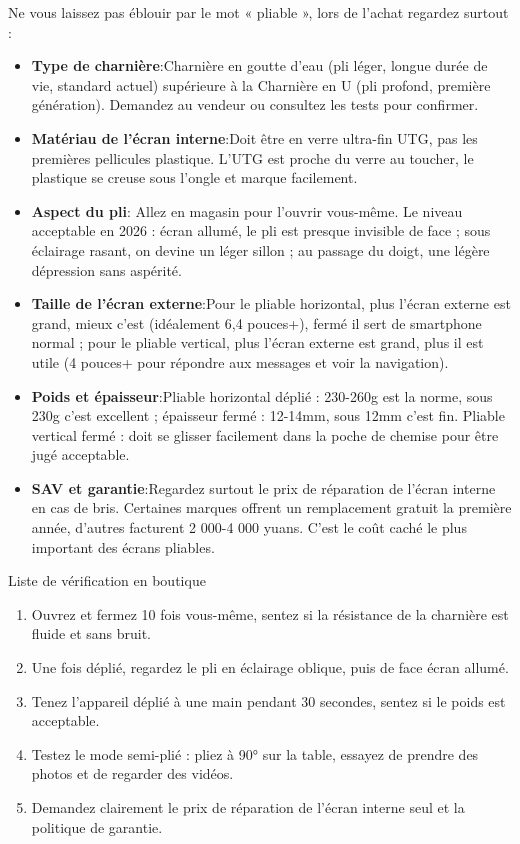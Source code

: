 
Ne vous laissez pas éblouir par le mot « pliable », lors de l'achat regardez surtout :

\begin{itemize}
  \item \textbf{Type de charnière}:Charnière en goutte d'eau (pli léger, longue durée de vie, standard actuel) supérieure à la Charnière en U (pli profond, première génération). Demandez au vendeur ou consultez les tests pour confirmer.
  \item \textbf{Matériau de l'écran interne}:Doit être en verre ultra-fin UTG, pas les premières pellicules plastique. L’UTG est proche du verre au toucher, le plastique se creuse sous l’ongle et marque facilement.
  \item \textbf{Aspect du pli}: Allez en magasin pour l'ouvrir vous-même. Le niveau acceptable en 2026 : écran allumé, le pli est presque invisible de face ; sous éclairage rasant, on devine un léger sillon ; au passage du doigt, une légère dépression sans aspérité.
  \item \textbf{Taille de l'écran externe}:Pour le pliable horizontal, plus l'écran externe est grand, mieux c'est (idéalement 6,4 pouces+), fermé il sert de smartphone normal ; pour le pliable vertical, plus l'écran externe est grand, plus il est utile (4 pouces+ pour répondre aux messages et voir la navigation).
  \item \textbf{Poids et épaisseur}:Pliable horizontal déplié : 230-260g est la norme, sous 230g c'est excellent ; épaisseur fermé : 12-14mm, sous 12mm c'est fin. Pliable vertical fermé : doit se glisser facilement dans la poche de chemise pour être jugé acceptable.
  \item \textbf{SAV et garantie}:Regardez surtout le prix de réparation de l'écran interne en cas de bris. Certaines marques offrent un remplacement gratuit la première année, d'autres facturent 2 000-4 000 yuans. C'est le coût caché le plus important des écrans pliables.
\end{itemize}

\begin{tcbpractice}{Liste de vérification en boutique}
\begin{enumerate}
  \item Ouvrez et fermez 10 fois vous-même, sentez si la résistance de la charnière est fluide et sans bruit.
  \item Une fois déplié, regardez le pli en éclairage oblique, puis de face écran allumé.
  \item Tenez l'appareil déplié à une main pendant 30 secondes, sentez si le poids est acceptable.
  \item Testez le mode semi-plié : pliez à 90° sur la table, essayez de prendre des photos et de regarder des vidéos.
  \item Demandez clairement le prix de réparation de l'écran interne seul et la politique de garantie.
\end{enumerate}

\end{tcbpractice}

